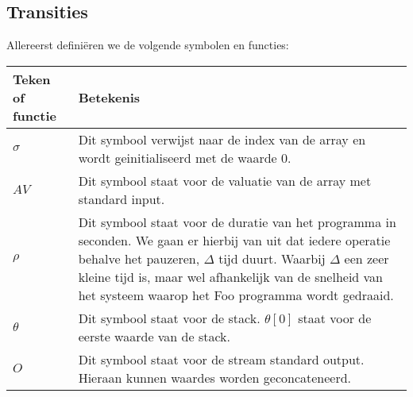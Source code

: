 \documentclass[11pt]{article}
\begin{document}
\subsection{Transities}
Allereerst defini\"eren we de volgende symbolen en functies:
\newline
\newline
\begin{tabular}{ | l | p{12cm} |}
    \hline
    Teken of functie & Betekenis \\ \hline
    \begin{math} \sigma \end{math} &  Dit symbool verwijst naar de index van de array en wordt geinitialiseerd met de waarde 0. \\ \hline
    \begin{math} AV \end{math} & Dit symbool staat voor de valuatie van de array met standard input. \\ \hline
    \begin{math} \rho \end{math} &  Dit symbool staat voor de duratie van het programma in seconden. We gaan er hierbij van uit dat iedere operatie behalve het pauzeren, \begin{math}\Delta\end{math} tijd duurt. Waarbij \begin{math}\Delta\end{math} een zeer kleine tijd is, maar wel afhankelijk van de snelheid van het systeem waarop het Foo programma wordt gedraaid.  \\ \hline
    \begin{math} \theta \end{math} & Dit symbool staat voor de stack. \begin{math}\theta[0]\end{math} staat voor de eerste waarde van de stack. \\ \hline
    \begin{math} O \end{math} &  Dit symbool staat voor de stream standard output. Hieraan kunnen waardes worden geconcateneerd. \\ \hline

\end{tabular}
\newline
\newline
\newline
\end{document}
